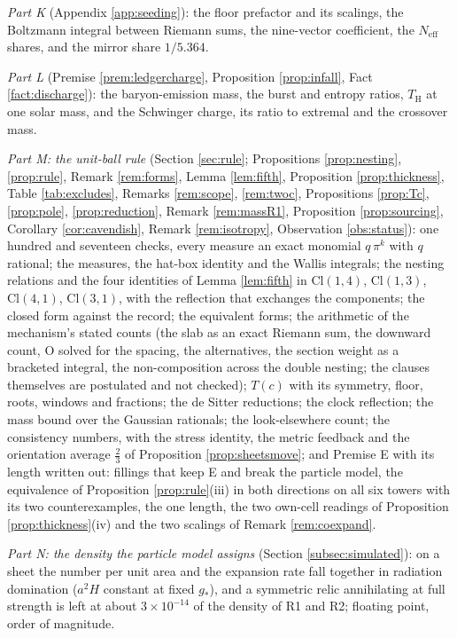 \documentclass[11pt]{article}
\theoremstyle{definition}
\newcommand{\Cl}{\mathrm{Cl}}
\newcommand{\Neff}{N_{\mathrm{eff}}}
\begin{document}
\emph{Part K} (Appendix \ref{app:seeding}): the floor prefactor and its scalings, the Boltzmann integral between Riemann sums, the nine-vector coefficient, the $\Neff$ shares, and the mirror share $1/5.364$.

\emph{Part L} (Premise \ref{prem:ledgercharge}, Proposition \ref{prop:infall}, Fact \ref{fact:discharge}): the baryon-emission mass, the burst and entropy ratios, $T_{\mathrm{H}}$ at one solar mass, and the Schwinger charge, its ratio to extremal and the crossover mass.

\emph{Part M: the unit-ball rule} (Section \ref{sec:rule}; Propositions \ref{prop:nesting}, \ref{prop:rule}, Remark \ref{rem:forms}, Lemma \ref{lem:fifth}, Proposition \ref{prop:thickness}, Table \ref{tab:excludes}, Remarks \ref{rem:scope}, \ref{rem:twoc}, Propositions \ref{prop:Tc}, \ref{prop:pole}, \ref{prop:reduction}, Remark \ref{rem:massR1}, Proposition \ref{prop:sourcing}, Corollary \ref{cor:cavendish}, Remark \ref{rem:isotropy}, Observation \ref{obs:status}): one hundred and seventeen checks, every measure an exact monomial $q\,\pi^{k}$ with $q$ rational; the measures, the hat-box identity and the Wallis integrals; the nesting relations and the four identities of Lemma \ref{lem:fifth} in $\Cl(1,4)$, $\Cl(1,3)$, $\Cl(4,1)$, $\Cl(3,1)$, with the reflection that exchanges the components; the closed form against the record; the equivalent forms; the arithmetic of the mechanism's stated counts (the slab as an exact Riemann sum, the downward count, O solved for the spacing, the alternatives, the section weight as a bracketed integral, the non-composition across the double nesting; the clauses themselves are postulated and not checked); $T(c)$ with its symmetry, floor, roots, windows and fractions; the de Sitter reductions; the clock reflection; the mass bound over the Gaussian rationals; the look-elsewhere count; the consistency numbers, with the stress identity, the metric feedback and the orientation average $\tfrac{2}{3}$ of Proposition \ref{prop:sheetsmove}; and Premise E with its length written out: fillings that keep E and break the particle model, the equivalence of Proposition \ref{prop:rule}(iii) in both directions on all six towers with its two counterexamples, the one length, the two own-cell readings of Proposition \ref{prop:thickness}(iv) and the two scalings of Remark \ref{rem:coexpand}.

\emph{Part N: the density the particle model assigns} (Section \ref{subsec:simulated}): on a sheet the number per unit area and the expansion rate fall together in radiation domination ($a^{2}H$ constant at fixed $g_{*}$), and a symmetric relic annihilating at full strength is left at about $3 \times 10^{-14}$ of the density of R1 and R2; floating point, order of magnitude.
\end{document}
